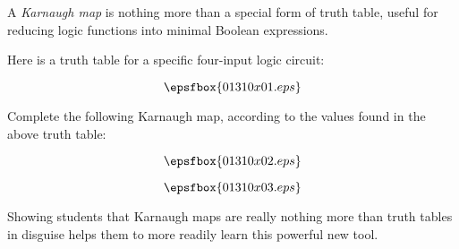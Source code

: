 

A {\it Karnaugh map} is nothing more than a special form of truth table, useful for reducing logic functions into minimal Boolean expressions.

Here is a truth table for a specific four-input logic circuit:

$$\epsfbox{01310x01.eps}$$

Complete the following Karnaugh map, according to the values found in the above truth table:

$$\epsfbox{01310x02.eps}$$







$$\epsfbox{01310x03.eps}$$







Showing students that Karnaugh maps are really nothing more than truth tables in disguise helps them to more readily learn this powerful new tool.




